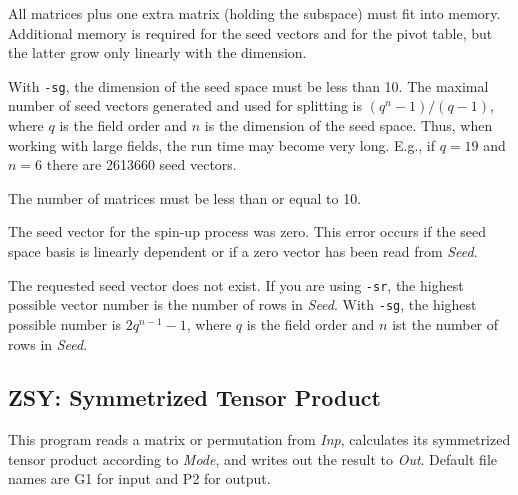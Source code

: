 \Limits
All matrices plus one extra matrix (holding the subspace) must
fit into memory. Additional memory is required for the seed
vectors and for the pivot table, but the latter grow only linearly
with the dimension.

With {\tt -sg}, the dimension of the seed space must be less than 10.
The maximal number of seed vectors generated and used for splitting is
$(q^n-1)/(q-1)$, where $q$ is the field order and $n$ is the
dimension of the seed space. Thus, when working with large fields,
the run time may become very long. E.g., if $q=19$ and $n=6$ there
are 2613660 seed vectors.

The number of matrices must be less than or equal to 10.


\Messages
{}
The seed vector for the spin-up process was zero. This error occurs if
the seed space basis is linearly dependent or if a zero vector has been
read from {\it Seed}.

The requested seed vector does not exist. If you are using
{\tt -sr}, the highest possible vector number is the number
of rows in {\it Seed}. With {\tt -sg}, the highest possible
number is $2q^{n-1}-1$, where $q$ is the field order and $n$ ist
the number of rows in {\it Seed}.



\subsection{ZSY: Symmetrized Tensor Product}
\Syntax
{}

\Description
This program reads a matrix or permutation from {\it Inp}, calculates
its symmetrized tensor product according to {\it Mode}, and writes out
the result to {\it Out}. Default file names are G1 for input and P2 for
output.

